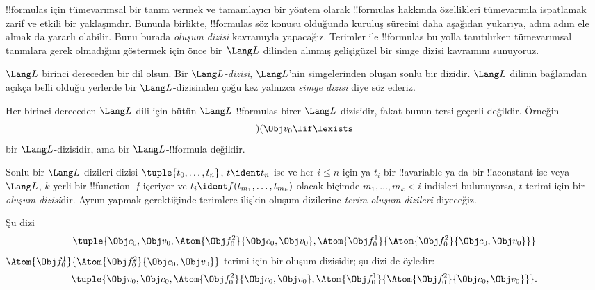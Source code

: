 \documentclass[../../../include/open-logic-section]{subfiles}
\begin{document}


!!{formula}s için tümevarımsal bir tanım vermek ve tamamlayıcı bir
yöntem olarak !!{formula}s hakkında özellikleri tümevarımla ispatlamak zarif
ve etkili bir yaklaşımdır. Bununla birlikte, !!{formula}s söz konusu
olduğunda kuruluş sürecini daha aşağıdan yukarıya, adım adım ele almak da yararlı olabilir. Bunu
burada \emph{oluşum dizisi} kavramıyla yapacağız.
%
Terimler ile !!{formula}s bu yolla tanıtılırken tümevarımsal tanımlara
gerek olmadığını göstermek için önce bir~$\Lang L$ dilinden
alınmış gelişigüzel bir simge dizisi kavramını sunuyoruz.

\begin{defn}
$\Lang L$ birinci dereceden bir dil olsun. Bir \emph{$\Lang L$-dizisi},
$\Lang L$'nin simgelerinden oluşan sonlu bir dizidir. $\Lang L$ dilinin
bağlamdan açıkça belli olduğu yerlerde bir $\Lang L$-dizisinden çoğu
kez yalnızca \emph{simge dizisi} diye söz ederiz.
\end{defn}

\begin{ex}
Her birinci dereceden $\Lang L$ dili için bütün
$\Lang L$-!!{formula}s birer $\Lang L$-dizisidir, fakat bunun tersi
geçerli değildir. Örneğin 
\[)(\Obj v_0\lif\lexists\]
bir $\Lang L$-dizisidir, ama bir $\Lang L$-!!{formula} değildir.
\end{ex}

\begin{defn}
Sonlu bir $\Lang L$-dizileri dizisi $\tuple{t_0,\dotsc,t_n}$, $t \ident
t_n$ ise ve her $i \leq n$ için ya $t_i$ bir !!a{variable} ya da bir
!!a{constant} ise veya $\Lang L$, $k$-yerli bir !!{function}~$f$
içeriyor ve $t_i \ident f(t_{m_1},\dotsc,t_{m_k})$ olacak biçimde
$m_1,\dotsc,m_k < i$ indisleri bulunuyorsa, $t$ terimi için bir
\emph{oluşum dizisi}dir. Ayrım yapmak gerektiğinde terimlere ilişkin
oluşum dizilerine \emph{terim oluşum dizileri} diyeceğiz.
\end{defn}

\begin{ex}
Şu dizi
\[
    \tuple{\Obj c_0, \Obj v_0, \Atom{\Obj f^2_0}{\Obj c_0, \Obj v_0}, \Atom{\Obj f^1_0}{\Atom{\Obj f^2_0}{\Obj c_0, \Obj v_0}}}
\]
$\Atom{\Obj f^1_0}{\Atom{\Obj f^2_0}{\Obj c_0, \Obj v_0}}$ terimi için
bir oluşum dizisidir; şu dizi de öyledir:
\[
    \tuple{\Obj v_0, \Obj c_0, \Atom{\Obj f^2_0}{\Obj c_0, \Obj v_0}, \Atom{\Obj f^1_0}{\Atom{\Obj f^2_0}{\Obj c_0, \Obj v_0}}}.
\]
\end{ex}
\end{document}
